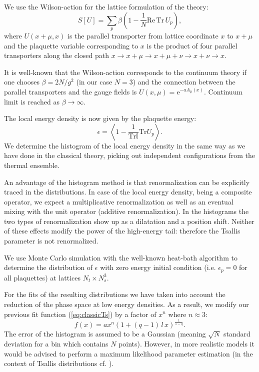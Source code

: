 \documentclass[aps,prd,twocolumn,showpacs,superscriptaddress,groupedaddress]{revtex4}  %
\begin{document}
We use the Wilson-action for the lattice formulation of the theory:
\begin{equation}
S[U]=\sum_p \beta\left( 1-\frac{1}{N}\mathrm{Re}\, \mathrm{Tr}\, U_p\right),
\end{equation}
where $U(x+\mu ,x)$ is the parallel transporter from lattice
coordinate $x$ to $x+\mu$ and the plaquette variable corresponding to
$x$ is the product of four parallel transporters along the closed path
$x\rightarrow x+\mu \rightarrow x+\mu +\nu \rightarrow x+\nu
\rightarrow x$.

It is well-known that the Wilson-action corresponds to the continuum
theory if one chooses \mbox{$\beta = 2 N / g^2$} (in our case $N=3$)
and the connection between the parallel transporters and the gauge
fields is \mbox{$U(x,\mu)=\textrm{e}^{-a A_\mu(x)}$}. Continuum limit
is reached as $\beta\to\infty$.

The local energy density is now given by the plaquette energy:
\begin{equation}
\epsilon=\left\langle 1 - \frac{1}{\mathrm{Tr}\mathbb{I}}\mathrm{Tr}U_p\right\rangle.
\end{equation}
We determine the histogram of the local energy density in the same way
as we have done in the classical theory, picking out independent
configurations from the thermal ensemble.

An advantage of the histogram method is that renormalization can be
explicitly traced in the distributions. In case of the local energy
density, being a composite operator, we expect a multiplicative
renormalization as well as an eventual mixing with the unit operator
(additive renormalization). In the histograms the two types of
renormalization show up as a dilatation and a position shift. Neither
of these effects modify the power of the high-energy tail: therefore
the Tsallis parameter is not renormalized.

We use Monte Carlo simulation with the well-known heat-bath algorithm
to determine the distribution of $\epsilon$ with zero energy initial
condition (i.e. \mbox{$\epsilon_p=0$} for all plaquettes) at lattices $N_t\times N_s^3$.

For the fits of the resulting distributions we have taken into account
the reduction of the phase space at low energy densities.  As a
result, we modify our previous fit function (\ref{eq:classicTs}) by a
factor of $x^n$ where $n\approx3$:
\begin{equation}
f(x)=ax^n (1+(q-1)\,l\,x)^{\frac{1}{1-q}}.
\label{eq:su3Ts}
\end{equation}
The error of the histogram is assumed to be a Gaussian (meaning
$\sqrt{N}$ standard deviation for a bin which contains $N$
points). However, in more realistic models it would be advised to
perform a maximum likelihood parameter estimation (in the context of
Tsallis distributions cf. \cite{Shalizi:2017}).
\end{document}
